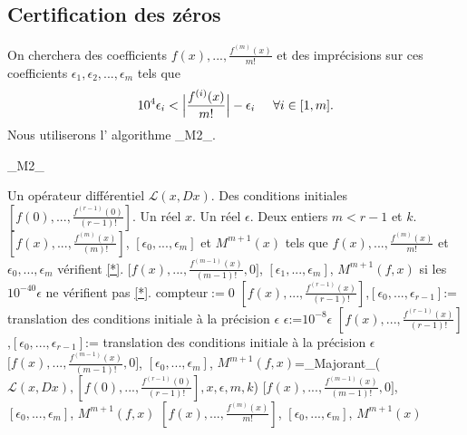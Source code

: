 \documentclass[a4paper,10pt]{article}
\begin{document}
	\subsection{Certification des zéros}
	On cherchera des coefficients $f(x),...,\frac{f^{(m)}(x)}{m!}$ et des imprécisions sur ces coefficients $\epsilon_1,\epsilon_2,...,\epsilon_m$ tels que 
	\begin{equation}
		10^{4}\epsilon_i<\Big|\frac{f^{(i)}(x)}{m!}\Big|-\epsilon_i \hspace{5mm}\forall i \in [1,m].
		\label{*}
	\end{equation}
	Nous utiliserons l' algorithme \_M2\_.
	\begin{algorithm}
		\caption{\_M2\_}
		\begin{algorithmic}[1]
			\REQUIRE Un opérateur différentiel $\mathcal{L}(x,Dx)$. Des conditions initiales $[f(0),...,\frac{f^{(r-1)}(0)}{(r-1)!}]$. Un réel $x$. Un réel $\epsilon$. Deux entiers $m< r-1$ et $k$.
			\ENSURE  $[f(x),...,\frac{f^{(m)}(x)}{(m)!}]$, $[\epsilon_0,...,\epsilon_{m}]$ et  $M^{m+1}(x)$  tels que $f(x),...,\frac{f^{(m)}(x)}{m!}$ et $\epsilon_0,...,\epsilon_m$ vérifient \eqref{*}. $\big[f(x),...,\frac{f^{(m-1)}(x)}{(m-1)!},0\big]$, $[\epsilon_1,...,\epsilon_{m}]$, $M^{m+1}(f,x)$ si les $10^{-40}\epsilon$ ne vérifient pas \eqref{*}.
			\STATE compteur$:=0$
			\STATE $[f(x),...,\frac{f^{(r-1)}(x)}{(r-1)!}]$,$[\epsilon_0,...,\epsilon_{r-1}]$:= translation des conditions initiale à la précision $\epsilon$
			\STATE $\epsilon$:=$10^{-8}\epsilon$
			\STATE  $[f(x),...,\frac{f^{(r-1)}(x)}{(r-1)!}]$,$[\epsilon_0,...,\epsilon_{r-1}]$:= translation des conditions initiale à la précision $\epsilon$
			\ENDWHILE
			\STATE $\big[f(x),...,\frac{f^{(m-1)}(x)}{(m-1)!},0\big]$, $[\epsilon_0,...,\epsilon_{m}]$, $M^{m+1}(f,x)$=\_Majorant\_($\mathcal{L}(x,Dx),[f(0),...,\frac{f^{(r-1)}(0)}{(r-1)!}],x,\epsilon,m,k$)
			\RETURN $\big[f(x),...,\frac{f^{(m-1)}(x)}{(m-1)!},0\big]$, $[\epsilon_0,...,\epsilon_{m}]$, $M^{m+1}(f,x)$
			\ELSE
			\RETURN $[f(x),...,\frac{f^{(m)}(x)}{m!}]$, $[\epsilon_0,...,\epsilon_{m}]$, $M^{m+1}(x)$
			\ENDIF
		\end{algorithmic}
	\label{algo_eps}
	\end{algorithm}
	
\end{document}
